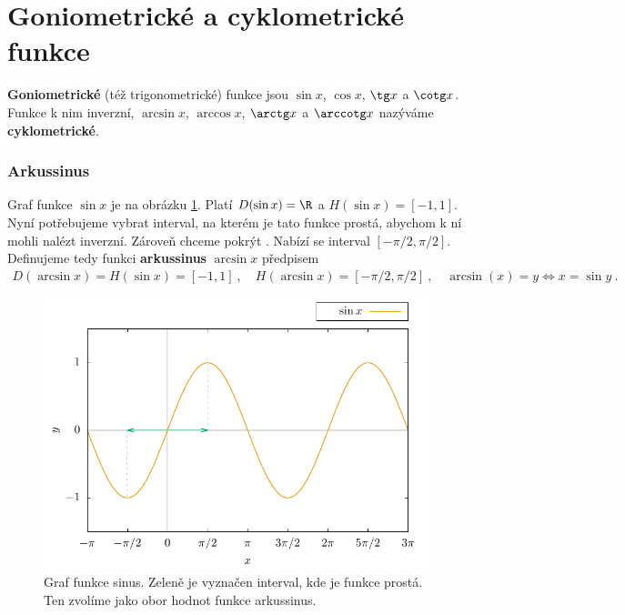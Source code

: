 \section*{Goniometrické a cyklometrické funkce}

\textbf{Goniometrické} (též trigonometrické) funkce jsou $\sin x$, $\cos x$, $\tg x$ a $\cotg x$. Funkce k nim inverzní, $\arcsin x$, $\arccos x$, $\arctg x$ a $\arccotg x$ nazýváme \textbf{cyklometrické}.

\subsubsection*{Arkussinus}

Graf funkce $\sin x$ je na obrázku \ref{fig:sinus}. Platí $D(\sin x) = \R$ a $H(\sin x) = [-1,1]$. Nyní potřebujeme vybrat interval, na kterém je tato funkce prostá, abychom k ní mohli nalézt inverzní. Zároveň chceme pokrýt . Nabízí se interval $[-\pi/2, \pi/2]$. Definujeme tedy funkci \textbf{arkussinus} $\arcsin x$ předpisem \begin{align}
    D(\arcsin x) = H(\sin x) = [-1,1] \:, \quad H(\arcsin x) = [-\pi/2, \pi/2] \:, \quad \arcsin(x) = y \Longleftrightarrow x = \sin y \:.
\end{align}

\begin{figure}[H]
    \centering
    \includegraphics{Gnuplot/cv1/Figures/sinusgraf.pdf}
    \caption{Graf funkce sinus. Zeleně je vyznačen interval, kde je funkce prostá. Ten zvolíme jako obor hodnot funkce arkussinus.}
    \label{fig:sinus}
\end{figure}


